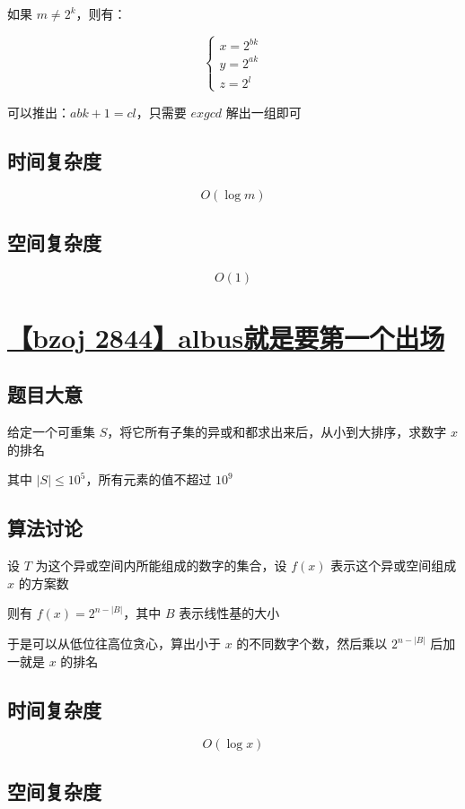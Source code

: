 \documentclass[UTF8]{article}
\begin{document}
如果 $m \not= 2^k$，则有：

$$
\begin{cases}
x=2^{bk} \\
y=2^{ak} \\
z=2^{l}
\end{cases}
$$

可以推出：$abk+1=cl$，只需要 $exgcd$ 解出一组即可

\subsection{时间复杂度}

$$
O(\log m)
$$

\subsection{空间复杂度}

$$
O(1)
$$

\section{\href{https://www.lydsy.com/JudgeOnline/problem.php?id=2844}{【bzoj 2844】albus就是要第一个出场}}

\subsection{题目大意}

给定一个可重集 $S$，将它所有子集的异或和都求出来后，从小到大排序，求数字 $x$ 的排名

其中 $|S| \le 10^5$，所有元素的值不超过 $10^9$

\subsection{算法讨论}

设 $T$ 为这个异或空间内所能组成的数字的集合，设 $f(x)$ 表示这个异或空间组成 $x$ 的方案数

则有 $f(x)=2^{n-|B|}$，其中 $B$ 表示线性基的大小

于是可以从低位往高位贪心，算出小于 $x$ 的不同数字个数，然后乘以 $2^{n-|B|}$ 后加一就是 $x$ 的排名

\subsection{时间复杂度}

$$
O(\log x)
$$

\subsection{空间复杂度}
\end{document}
